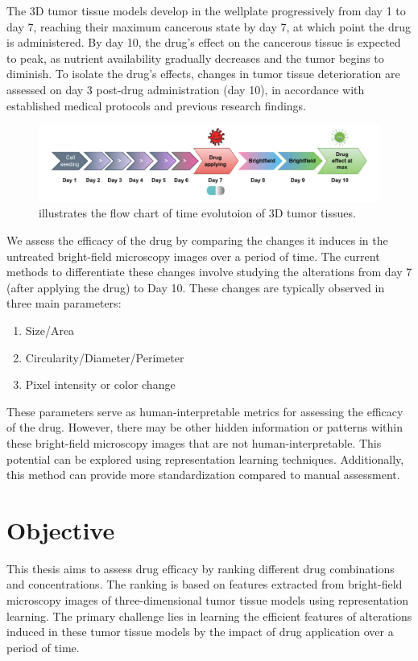 \documentclass[12pt,twoside,a4paper,parskip]{scrbook} %
\begin{document}
The 3D tumor tissue models develop in the wellplate progressively from day 1 to day 7, reaching their maximum cancerous state by day 7, at which point the drug is administered. By day 10, the drug's effect on the cancerous tissue is expected to peak, as nutrient availability gradually decreases and the tumor begins to diminish. To isolate the drug's effects, changes in tumor tissue deterioration are assessed on day 3 post-drug administration (day 10),  in accordance with established medical protocols and previous research findings.
\begin{figure}[H]
  \centering
  \includegraphics[scale=0.9]{figures/time.pdf} 
  \caption{illustrates the flow chart of time evolutoion of 3D tumor tissues.}
  \label{fig:time}
\end{figure}

We assess the efficacy of the drug by comparing the changes it induces in the untreated bright-field microscopy images over a period of time. The current methods to differentiate these changes involve studying the alterations from day 7 (after applying the drug) to Day 10. These changes are typically observed in three main parameters: 

\begin{enumerate}
  \item Size/Area
  \item Circularity/Diameter/Perimeter
  \item Pixel intensity or color change
\end{enumerate}

These parameters serve as human-interpretable metrics for assessing the efficacy of the drug. However, there may be other hidden information or patterns within these bright-field microscopy images that are not human-interpretable. This potential can be explored using representation learning techniques. Additionally, this method can provide more standardization compared to manual assessment.
\let\cleardoublepage\clearpage
\chapter{Objective}\label{ch:Objective}
This thesis aims to assess drug efficacy by ranking different drug combinations and concentrations. The ranking is based on features extracted from bright-field microscopy images of  three-dimensional tumor tissue models using representation learning. The primary challenge lies in learning the efficient features of alterations induced in these tumor tissue models by the impact of drug application over a period of time.
\let\cleardoublepage\clearpage
\end{document}
